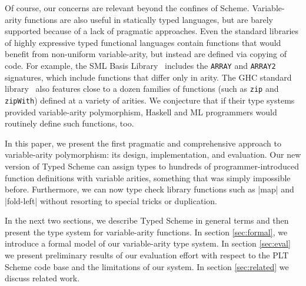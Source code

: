 \begin{schemeregion}
Of course, our concerns are relevant beyond the confines of Scheme.
Variable-arity functions are also useful in statically typed
languages, but are barely supported because of a lack of pragmatic
approaches.  Even the standard libraries of highly expressive typed
functional languages contain functions that would benefit from
non-uniform variable-arity, but instead are defined via copying of
code.  For example, the SML Basis Library~\cite{sml-basis} includes
the \Verb|ARRAY| and \Verb|ARRAY2| signatures, which include functions
that differ only in arity.  The GHC standard library~\cite{manual:ghc}
also features close to a dozen families of functions (such as
\Verb|zip| and \Verb|zipWith|) defined at a variety of arities.  We
conjecture that if their type systems provided variable-arity
polymorphism, Haskell and ML programmers would routinely define such
functions, too.

In this paper, we present the first pragmatic and comprehensive approach
 to variable-arity polymorphism: its design, implementation, and evaluation.
Our new version of Typed Scheme can assign types to hundreds of
programmer-introduced function definitions with variable arities,
something that was simply impossible before. Furthermore, we can now
type check library functions such as \scheme|map| and
\scheme|fold-left| without resorting to special tricks or duplication.

 In the next two sections, we describe
 Typed Scheme in general terms and then present the type system for
 variable-arity functions.  In
 section \ref{sec:formal}, we introduce a formal model of our
 variable-arity type system.  %
 In section \ref{sec:eval} we present
 preliminary results of our evaluation effort with
 respect to the PLT Scheme code base and the limitations of our system.  In section
 \ref{sec:related} we discuss related work.

\end{schemeregion}
